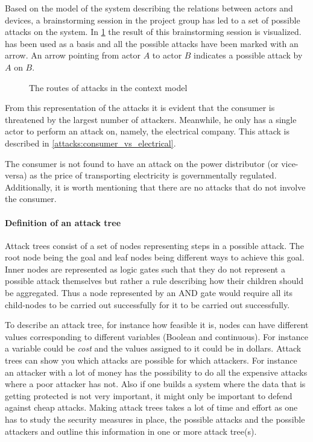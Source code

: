 
Based on the model of the system describing the relations between actors and devices, a brainstorming session in the project group has led to a set of possible attacks on the system.
In \cref{contextual:sm_model_attack} the result of this brainstorming session is visualized.
 has been used as a basis and all the possible attacks have been marked with an arrow.
An arrow pointing from actor $A$ to actor $B$ indicates a possible attack by $A$ on $B$.

\begin{figure}[h]
  \centering
  
  \caption{The routes of attacks in the context model}
  \label{contextual:sm_model_attack}
\end{figure}

From this representation of the attacks it is evident that the consumer is threatened by the largest number of attackers.
Meanwhile, he only has a single actor to perform an attack on, namely, the electrical company.
This attack is described in \cref{attacks:consumer_vs_electrical}.

The consumer is not found to have an attack on the power distributor (or vice-versa) as the price of transporting electricity is governmentally regulated.
Additionally, it is worth mentioning that there are no attacks that do not involve the consumer.

\paragraph{Definition of an attack tree}
Attack trees consist of a set of nodes representing steps in a possible attack.
The root node being the goal and leaf nodes being different ways to achieve this goal.
Inner nodes are represented as logic gates such that they do not represent a possible attack themselves but rather a rule describing how their children should be aggregated.
Thus a node represented by an AND gate would require all its child-nodes to be carried out successfully for it to be carried out successfully.

To describe an attack tree, for instance how feasible it is, nodes can have different values corresponding to different variables (Boolean and continuous).
For instance a variable could be \textit{cost} and the values assigned to it could be in dollars.
Attack trees can show you which attacks are possible for which attackers.
For instance an attacker with a lot of money has the possibility to do all the expensive attacks where a poor attacker has not.
Also if one builds a system where the data that is getting protected is not very important, it might only be important to defend against cheap attacks.
Making attack trees takes a lot of time and effort as one has to study the security measures in place, the possible attacks and the possible attackers and outline this information in one or more attack tree(s).\cite{schneier_attack_trees}
